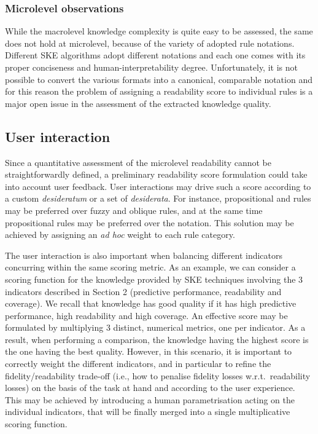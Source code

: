 \documentclass[sigconf]{acmart}
\begin{document}
\subsubsection{Microlevel observations}

While the macrolevel knowledge complexity is quite easy to be assessed, the same does not hold at microlevel, because of the variety of adopted rule notations.
%
Different SKE algorithms adopt different notations and each one comes with its proper conciseness and human-interpretability degree.
%
Unfortunately, it is not possible to convert the various formats into a canonical, comparable notation and for this reason the problem of assigning a readability score to individual rules is a major open issue in the assessment of the extracted knowledge quality.

\subsection{User interaction}

Since a quantitative assessment of the microlevel readability cannot be straightforwardly defined, a preliminary readability score formulation could take into account user feedback.
%
User interactions may drive such a score according to a custom \emph{desideratum} or a set of \emph{desiderata}.
%
For instance, propositional and \mofn{} rules may be preferred over fuzzy and oblique rules, and at the same time propositional rules may be preferred over the \mofn{} notation.
%
This solution may be achieved by assigning an \emph{ad hoc} weight to each rule category.

The user interaction is also important when balancing different indicators concurring within the same scoring metric.
%
As an example, we can consider a scoring function for the knowledge provided by SKE techniques involving the 3 indicators described in Section 2 (predictive performance, readability and coverage).
%
We recall that knowledge has good quality if it has high predictive performance, high readability and high coverage.
%
An effective score may be formulated by multiplying 3 distinct, numerical metrics, one per indicator.
%
As a result, when performing a comparison, the knowledge having the highest score is the one having the best quality.
%
However, in this scenario, it is important to correctly weight the different indicators, and in particular to refine the fidelity/readability trade-off (i.e., how to penalise fidelity losses w.r.t.\ readability losses) on the basis of the task at hand and according to the user experience.
%
This may be achieved by introducing a human parametrisation acting on the individual indicators, that will be finally merged into a single multiplicative scoring function.
\end{document}
